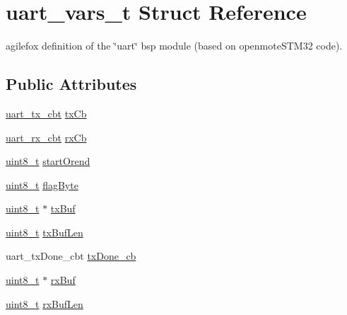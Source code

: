 \hypertarget{structuart__vars__t}{}\section{uart\+\_\+vars\+\_\+t Struct Reference}
\label{structuart__vars__t}


agilefox definition of the \char`\"{}uart\char`\"{} bsp module (based on openmote\+S\+T\+M32 code).  


\subsection*{Public Attributes}
\begin{DoxyCompactItemize}
\item 
\hyperlink{group__uart_gae005b96f0b18aecb814f4979c3e33408}{uart\+\_\+tx\+\_\+cbt} \hyperlink{structuart__vars__t_a1783a73b6fd0c934e97393aafcb077f6}{tx\+Cb}
\item 
\hyperlink{group__uart_gab8f8d6449d6a994dfb5ede3fca7ac4e2}{uart\+\_\+rx\+\_\+cbt} \hyperlink{structuart__vars__t_aed01467805ffbb9ed9a889566ff394e0}{rx\+Cb}
\item 
\hyperlink{_p_e___types_8h_aba7bc1797add20fe3efdf37ced1182c5}{uint8\+\_\+t} \hyperlink{structuart__vars__t_acec80286378c746faf2e8957f5211f4d}{start\+Orend}
\item 
\hyperlink{_p_e___types_8h_aba7bc1797add20fe3efdf37ced1182c5}{uint8\+\_\+t} \hyperlink{structuart__vars__t_a746aeb8ba921915eeb7c497ec2bc9d86}{flag\+Byte}
\item 
\hyperlink{_p_e___types_8h_aba7bc1797add20fe3efdf37ced1182c5}{uint8\+\_\+t} $\ast$ \hyperlink{structuart__vars__t_a982634cda88470a61b1364330374b5b0}{tx\+Buf}
\item 
\hyperlink{_p_e___types_8h_aba7bc1797add20fe3efdf37ced1182c5}{uint8\+\_\+t} \hyperlink{structuart__vars__t_a22b20980da9c744b84a2e614a2e7585c}{tx\+Buf\+Len}
\item 
uart\+\_\+tx\+Done\+\_\+cbt \hyperlink{structuart__vars__t_a80cbcfa962a9636c36027b6d16b03618}{tx\+Done\+\_\+cb}
\item 
\hyperlink{_p_e___types_8h_aba7bc1797add20fe3efdf37ced1182c5}{uint8\+\_\+t} $\ast$ \hyperlink{structuart__vars__t_ab81c342109d030db90738127a606e203}{rx\+Buf}
\item 
\hyperlink{_p_e___types_8h_aba7bc1797add20fe3efdf37ced1182c5}{uint8\+\_\+t} \hyperlink{structuart__vars__t_ab0adf48baad02d00debbddefacd3a7a2}{rx\+Buf\+Len}
\item 

\end{DoxyCompactItemize}
